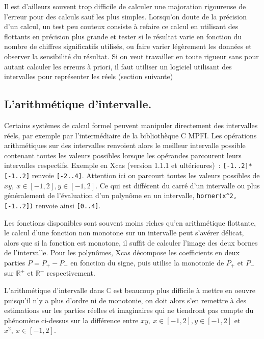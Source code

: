 \documentclass[a4paper,11pt]{article}
\newcommand{\R}{{\mathbb{R}}}
\newcommand{\C}{{\mathbb{C}}}
\begin{document}
Il est d'ailleurs souvent trop difficile de calculer une majoration
rigoureuse de l'erreur pour des calculs sauf les plus simples.
Lorsqu'on doute de la précision d'un calcul, un test peu couteux consiste
à refaire ce calcul en utilisant des flottants en précision plus
grande et tester si le résultat varie en fonction du nombre de chiffres
significatifs utilisés, ou faire varier l\'eg\`erement
les donn\'ees et observer la sensibilit\'e du r\'esultat.
Si on veut travailler en toute rigueur sans
pour autant calculer les erreurs à priori, il faut utiliser un logiciel
utilisant des intervalles pour représenter les réels (section suivante)

\subsection{L'arithm\'etique d'intervalle.}
Certains syst\`emes de calcul formel peuvent manipuler directement
des intervalles r\'eels, par exemple par l'interm\'ediaire de la
bibliothèque C MPFI. Les op\'erations arithm\'etiques sur des
intervalles renvoient alors le meilleur intervalle possible contenant
toutes les valeurs possibles lorsque les op\'erandes parcourent
leurs intervalles respectifs.
Exemple en Xcas (version 1.1.1 et ult\'erieures)~:
\verb|[-1..2]*[-1..2]| renvoie \verb|[-2..4]|.
Attention ici on parcourt toutes les valeurs possibles de 
$xy, \ x \in [-1,2], y \in [-1,2]$. Ce qui est diff\'erent du carr\'e
d'un intervalle ou plus g\'en\'eralement de l'\'evaluation
d'un polyn\^ome en un intervalle, \verb|horner(x^2,[-1..2])|
renvoie ainsi \verb|[0..4]|.

Les fonctions disponibles sont souvent moins riches qu'en
arithm\'etique flottante, le calcul d'une fonction non monotone
sur un intervalle peut s'av\'erer d\'elicat, alors que si la fonction
est monotone, il suffit de calculer l'image des deux bornes
de l'intervalle. Pour les polyn\^omes, Xcas d\'ecompose
les coefficients en deux parties $P=P_+-P_-$ en fonction
du signe, puis utilise la monotonie de $P_+$ et $P_-$ sur
$\R^+$ et $\R^-$ respectivement.

L'arithm\'etique d'intervalle dans $\C$ est beaucoup plus difficile
\`a mettre en oeuvre puisqu'il n'y a plus d'ordre ni de monotonie,
on doit alors s'en remettre \`a des estimations sur les parties
r\'eelles et imaginaires qui ne tiendront pas compte du ph\'enom\`ene
ci-dessus sur la diff\'erence entre $xy, \ x \in [-1,2], y \in [-1,2]$
et $x^2, \ x \in [-1,2]$.
\end{document}
